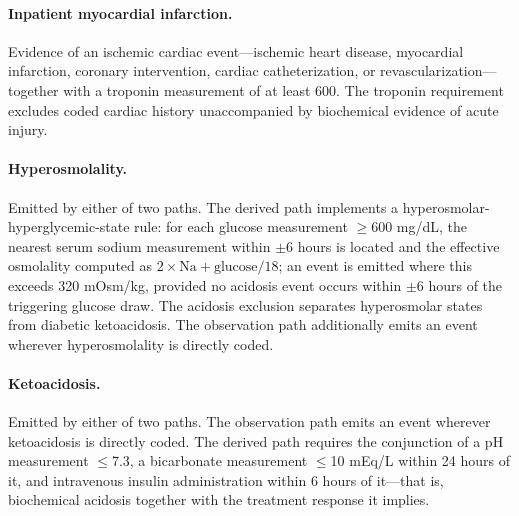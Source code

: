 \documentclass[11pt,a4paper]{article}
\begin{document}
\paragraph{Inpatient myocardial infarction.}
Evidence of an ischemic cardiac event---ischemic heart disease, myocardial
infarction, coronary intervention, cardiac catheterization, or
revascularization---together with a troponin measurement of at least 600. The
troponin requirement excludes coded cardiac history unaccompanied by
biochemical evidence of acute injury.

\paragraph{Hyperosmolality.}
Emitted by either of two paths. The derived path implements a
hyperosmolar-hyperglycemic-state rule: for each glucose measurement
$\geq$600 mg/dL, the nearest serum sodium measurement within $\pm$6 hours is
located and the effective osmolality computed as
$2 \times \mathrm{Na} + \mathrm{glucose}/18$; an event is emitted where this
exceeds 320 mOsm/kg, provided no acidosis event occurs within $\pm$6 hours of
the triggering glucose draw. The acidosis exclusion separates hyperosmolar
states from diabetic ketoacidosis. The observation path additionally emits an
event wherever hyperosmolality is directly coded.

\paragraph{Ketoacidosis.}
Emitted by either of two paths. The observation path emits an event wherever
ketoacidosis is directly coded. The derived path requires the conjunction of
a pH measurement $\leq$7.3, a bicarbonate measurement $\leq$10 mEq/L within
24 hours of it, and intravenous insulin administration within 6 hours of
it---that is, biochemical acidosis together with the treatment response it
implies.
\end{document}
